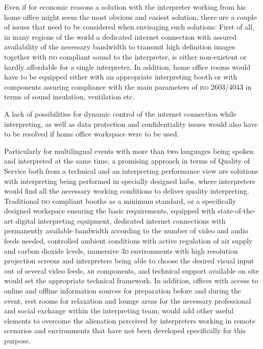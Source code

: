 \documentclass[output=paper]{langsci/langscibook}
\begin{document}
Even if for economic reasons a solution with the interpreter working from his home office might seem the most obvious and easiest solution, there are a couple of issues that need to be considered when envisaging such solutions: First of all, in many regions of the world a dedicated internet connection with assured availability of the necessary bandwidth to transmit high definition images together with \textsc{iso} compliant sound to the interpreter, is either non-existent or hardly affordable for a single interpreter. In addition, home office rooms would have to be equipped either with an appropriate interpreting booth or with components assuring compliance with the main parameters of \textsc{iso 2603/4043} in terms of sound insulation, ventilation etc.

A lack of possibilities for dynamic control of the internet connection while interpreting, as well as data protection and confidentiality issues would also have to be resolved if home office workspace were to be used.

Particularly for multilingual events with more than two languages being spoken and interpreted at the same time, a promising approach in terms of Quality of Service both from a technical and an interpreting performance view are solutions with interpreting being performed in specially designed hubs, where interpreters would find all the necessary working conditions to deliver quality interpreting. Traditional \textsc{iso} compliant booths as a minimum standard, or a specifically designed workspace ensuring the basic requirements, equipped with state-of-the-art digital interpreting equipment, dedicated internet connections with permanently available bandwidth according to the number of video and audio feeds needed, controlled ambient conditions with active regulation of air supply and carbon dioxide levels, immersive \textsc{3d} environments with high resolution projection screens and interpreters being able to choose the desired visual input out of several video feeds, \textsc{ar} components, and technical support available on site would set the appropriate technical framework. In addition, offices with access to online and offline information sources for preparation before and during the event, rest rooms for relaxation and lounge areas for the necessary professional and social exchange within the interpreting team, would add other useful elements to overcome the alienation perceived by interpreters working in remote scenarios and environments that have not been developed specifically for this purpose. 
\end{document}
